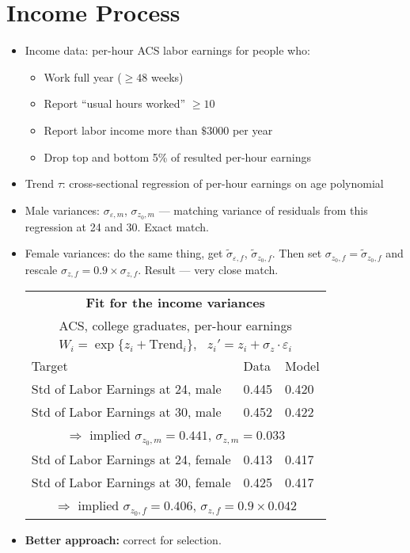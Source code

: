 \documentclass[12pt,letter]{article}
\begin{document}
\section{Income Process}
\begin{itemize}
\item Income data: per-hour ACS labor earnings for people who:
\begin{itemize}
\item Work full year ($\geq 48$ weeks)
\item Report ``usual hours worked'' $\geq 10$
\item Report labor income more than $\$ 3000$ per year
\item Drop top and bottom 5\% of resulted per-hour earnings
\end{itemize}
\item Trend $\tau$: cross-sectional regression of per-hour earnings on age polynomial
\item Male variances: $\sigma_{\varepsilon,m}$, $\sigma_{z_0,m}$ --- matching variance of residuals from this regression at 24 and 30. Exact match.
\item Female variances: do the same thing, get $\tilde\sigma_{\varepsilon,f}$, $\tilde\sigma_{z_0,f}$. Then set $\sigma_{z_0,f} = \tilde\sigma_{z_0,f}$ and rescale $\sigma_{z,f} = 0.9\times \sigma_{z,f}$. Result --- very close match.
\begin{center}
\begin{tabular}{|l|l|l|}\hline
\multicolumn{3}{|c|}{\textbf{Fit for the income variances}} \\
\multicolumn{3}{|c|}{ACS, college graduates, per-hour earnings} \\
\multicolumn{3}{|c|}{$W_i = \exp\{z_i + \text{Trend}_{i}\}, \ \ \ z_i' = z_i + \sigma_z\cdot \varepsilon_i$} \\\hline\hline
Target & Data & Model \\
Std of Labor Earnings at 24, male  & 0.445 & 0.420 \\
Std of Labor Earnings at 30, male & 0.452 & 0.422 \\\hline
\multicolumn{3}{|c|}{$\Rightarrow$ implied $\sigma_{z_0,m} = 0.441$, $\sigma_{z,m} = 0.033$} \\\hline\hline
Std of Labor Earnings at 24, female & 0.413 & 0.417\\
Std of Labor Earnings at 30, female & 0.425 & 0.417 \\\hline
\multicolumn{3}{|c|}{$\Rightarrow$ implied $\sigma_{z_0,f} = 0.406$, $\sigma_{z,f} = 0.9 \times 0.042$} \\\hline
\end{tabular}
\end{center}

\item \textbf{Better approach:} correct for selection.
\end{itemize}
\end{document}
